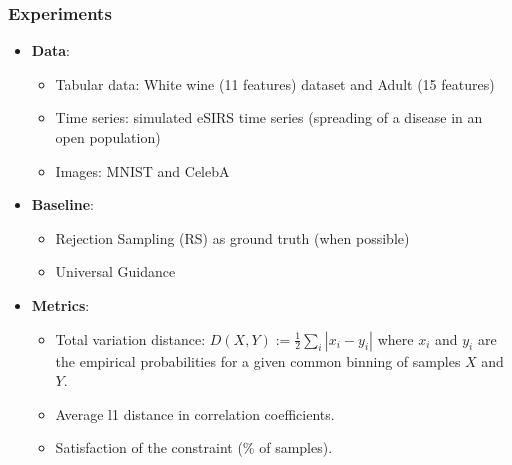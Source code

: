 \begin{frame} %
\frametitle{Experiments}

\begin{itemize}
    \item \textbf{Data}:
    \begin{itemize}
        \item Tabular data: White wine (11 features) dataset and Adult (15 features)
        \item Time series: simulated eSIRS time series (spreading of a disease in an open population)
        \item Images: MNIST and CelebA
    \end{itemize}
    \item \textbf{Baseline}:
    \begin{itemize}
        \item Rejection Sampling (RS) as ground truth (when possible)
        \item Universal Guidance \citep{bansal2023universal}
    \end{itemize}
    \item \textbf{Metrics}:
    \begin{itemize}
        \item Total variation distance: $ D(X,Y):=\frac{1}{2} \sum_i |x_i - y_i|$ where $x_i$ and $y_i$ are the empirical probabilities for a given common binning of samples $X$ and $Y$. %
        \item Average l1 distance in correlation coefficients.
        \item Satisfaction of the constraint (\% of samples).
    \end{itemize}
\end{itemize}

\end{frame} %




